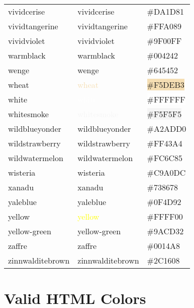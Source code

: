 \documentclass[
]{article}
\begin{document}
\begin{longtable}[]{@{}lll@{}}
vividcerise & \textcolor{vividcerise}{vividcerise} &
\colorbox{vividcerise}{\#DA1D81}\tabularnewline
vividtangerine & \textcolor{vividtangerine}{vividtangerine} &
\colorbox{vividtangerine}{\#FFA089}\tabularnewline
vividviolet & \textcolor{vividviolet}{vividviolet} &
\colorbox{vividviolet}{\#9F00FF}\tabularnewline
warmblack & \textcolor{warmblack}{warmblack} &
\colorbox{warmblack}{\#004242}\tabularnewline
wenge & \textcolor{wenge}{wenge} &
\colorbox{wenge}{\#645452}\tabularnewline
wheat & \textcolor{wheat}{wheat} &
\colorbox{wheat}{\#F5DEB3}\tabularnewline
white & \textcolor{white}{white} &
\colorbox{white}{\#FFFFFF}\tabularnewline
whitesmoke & \textcolor{whitesmoke}{whitesmoke} &
\colorbox{whitesmoke}{\#F5F5F5}\tabularnewline
wildblueyonder & \textcolor{wildblueyonder}{wildblueyonder} &
\colorbox{wildblueyonder}{\#A2ADD0}\tabularnewline
wildstrawberry & \textcolor{wildstrawberry}{wildstrawberry} &
\colorbox{wildstrawberry}{\#FF43A4}\tabularnewline
wildwatermelon & \textcolor{wildwatermelon}{wildwatermelon} &
\colorbox{wildwatermelon}{\#FC6C85}\tabularnewline
wisteria & \textcolor{wisteria}{wisteria} &
\colorbox{wisteria}{\#C9A0DC}\tabularnewline
xanadu & \textcolor{xanadu}{xanadu} &
\colorbox{xanadu}{\#738678}\tabularnewline
yaleblue & \textcolor{yaleblue}{yaleblue} &
\colorbox{yaleblue}{\#0F4D92}\tabularnewline
yellow & \textcolor{yellow}{yellow} &
\colorbox{electricyellow}{\#FFFF00}\tabularnewline
yellow-green & \textcolor{yellow-green}{yellow-green} &
\colorbox{yellow-green}{\#9ACD32}\tabularnewline
zaffre & \textcolor{zaffre}{zaffre} &
\colorbox{zaffre}{\#0014A8}\tabularnewline
zinnwalditebrown & \textcolor{zinnwalditebrown}{zinnwalditebrown} &
\colorbox{zinnwalditebrown}{\#2C1608}\tabularnewline
\bottomrule
\end{longtable}

\hypertarget{valid-html-colors}{%
\section{Valid HTML Colors}\label{valid-html-colors}}
\end{document}
